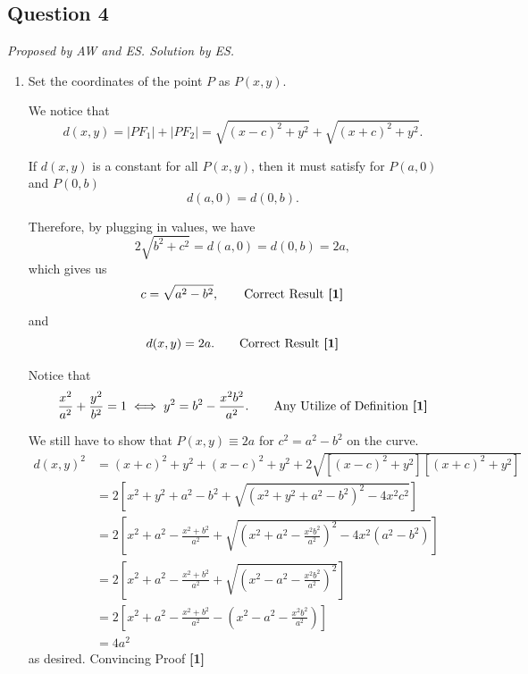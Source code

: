 \documentclass[12pt]{article}
\begin{document}
        \subsection{Question 4}
            \textit{Proposed by AW and ES. Solution by ES.}
            \begin{enumerate}
                \item 
                    Set the coordinates of the point \(P\) as \(P(x, y)\). 

                    We notice that
                    \[
                        d(x, y) = |PF_1| + |PF_2| = \sqrt{(x - c)^2 + y^2} + \sqrt{(x + c)^2 + y^2}.
                    \]

                    If \(d(x, y)\) is a constant for all \(P(x, y)\), then it must satisfy for \(P(a, 0)\) and \(P(0, b)\)
                    \[
                        d(a, 0) = d(0, b).
                    \]

                    Therefore, by plugging in values, we have
                    \[
                        2\sqrt{b^2 + c^2} = d(a, 0) = d(0, b) = 2a,
                    \]
                    which gives us 
                    \[
                        c = \sqrt{a^2 - b^2}, \tag*{Correct Result \textbf{[1]}}
                    \]
                    and
                    \[
                        d(x, y) = 2a. \tag*{Correct Result \textbf{[1]}}
                    \]

                    Notice that
                    \[
                        \frac{x^2}{a^2} + \frac{y^2}{b^2} = 1 \iff y^2 = b^2 - \frac{x^2 b^2}{a^2}. \tag*{Any Utilize of Definition \textbf{[1]}}
                    \]

                    We still have to show that \(P(x, y) \equiv 2a\) for \(c^2 = a^2 - b^2\) on the curve.
                    \begin{align*}
                        d(x, y)^2 &= (x+c)^2 + y^2 + (x-c)^2 + y^2 + 2 \sqrt{\left[(x-c)^2 +y^2\right] \left[(x+c)^2 + y^2\right]}\\
                        &= 2 \left[x^2 + y^2 + a^2 - b^2 + \sqrt{\left(x^2 + y^2 + a^2 - b^2\right)^2 - 4x^2c^2}\right]\\
                        &= 2 \left[x^2 + a^2 - \frac{x^2 + b^2}{a^2} + \sqrt{\left(x^2 + a^2 - \frac{x^2 b^2}{a^2}\right)^2 - 4x^2(a^2 - b^2)}\right]\\
                        &= 2 \left[x^2 + a^2 - \frac{x^2 + b^2}{a^2} + \sqrt{\left(x^2 - a^2 - \frac{x^2 b^2}{a^2}\right)^2}\right]\\
                        &= 2 \left[x^2 + a^2 - \frac{x^2 + b^2}{a^2} - \left(x^2 - a^2 - \frac{x^2 b^2}{a^2}\right) \right]\\
                        &= 4a^2
                    \end{align*}
                    as desired.
                    \hfill{Convincing Proof \textbf{[1]}}
                    

\end{enumerate}
\end{document}
